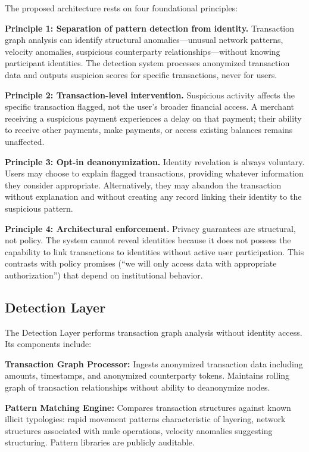 \documentclass[11pt]{article}
\begin{document}
The proposed architecture rests on four foundational principles:

\textbf{Principle 1: Separation of pattern detection from identity.} Transaction graph analysis can identify structural anomalies---unusual network patterns, velocity anomalies, suspicious counterparty relationships---without knowing participant identities. The detection system processes anonymized transaction data and outputs suspicion scores for specific transactions, never for users.

\textbf{Principle 2: Transaction-level intervention.} Suspicious activity affects the specific transaction flagged, not the user's broader financial access. A merchant receiving a suspicious payment experiences a delay on that payment; their ability to receive other payments, make payments, or access existing balances remains unaffected.

\textbf{Principle 3: Opt-in deanonymization.} Identity revelation is always voluntary. Users may choose to explain flagged transactions, providing whatever information they consider appropriate. Alternatively, they may abandon the transaction without explanation and without creating any record linking their identity to the suspicious pattern.

\textbf{Principle 4: Architectural enforcement.} Privacy guarantees are structural, not policy. The system cannot reveal identities because it does not possess the capability to link transactions to identities without active user participation. This contrasts with policy promises (``we will only access data with appropriate authorization'') that depend on institutional behavior.

\subsection{Detection Layer}

The Detection Layer performs transaction graph analysis without identity access. Its components include:

\textbf{Transaction Graph Processor:} Ingests anonymized transaction data including amounts, timestamps, and anonymized counterparty tokens. Maintains rolling graph of transaction relationships without ability to deanonymize nodes.

\textbf{Pattern Matching Engine:} Compares transaction structures against known illicit typologies: rapid movement patterns characteristic of layering, network structures associated with mule operations, velocity anomalies suggesting structuring. Pattern libraries are publicly auditable.
\end{document}

